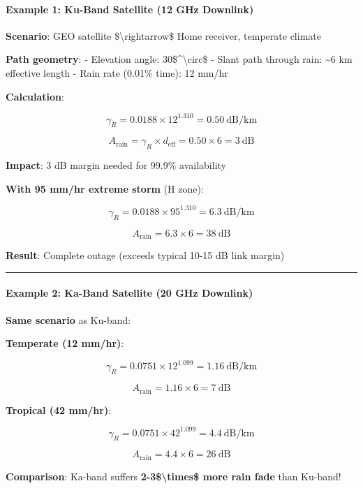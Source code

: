 \paragraph{Example 1: Ku-Band Satellite (12 GHz
Downlink)}\label{example-1-ku-band-satellite-12-ghz-downlink}

\textbf{Scenario}: GEO satellite \$\textbackslash rightarrow\$ Home
receiver, temperate climate

\textbf{Path geometry}: - Elevation angle: 30\$\^{}\textbackslash circ\$
- Slant path through rain: \textasciitilde6 km effective length - Rain
rate (0.01\% time): 12 mm/hr

\textbf{Calculation}:

\[
\gamma_R = 0.0188 \times 12^{1.310} = 0.50\ \text{dB/km}
\]

\[
A_{\text{rain}} = \gamma_R \times d_{\text{eff}} = 0.50 \times 6 = 3\ \text{dB}
\]

\textbf{Impact}: 3 dB margin needed for 99.9\% availability

\textbf{With 95 mm/hr extreme storm} (H zone):

\[
\gamma_R = 0.0188 \times 95^{1.310} = 6.3\ \text{dB/km}
\]

\[
A_{\text{rain}} = 6.3 \times 6 = 38\ \text{dB}
\]

\textbf{Result}: Complete outage (exceeds typical 10-15 dB link margin)

\begin{center}\rule{0.5\linewidth}{0.5pt}\end{center}

\paragraph{Example 2: Ka-Band Satellite (20 GHz
Downlink)}\label{example-2-ka-band-satellite-20-ghz-downlink}

\textbf{Same scenario} as Ku-band:

\textbf{Temperate (12 mm/hr)}:

\[
\gamma_R = 0.0751 \times 12^{1.099} = 1.16\ \text{dB/km}
\]

\[
A_{\text{rain}} = 1.16 \times 6 = 7\ \text{dB}
\]

\textbf{Tropical (42 mm/hr)}:

\[
\gamma_R = 0.0751 \times 42^{1.099} = 4.4\ \text{dB/km}
\]

\[
A_{\text{rain}} = 4.4 \times 6 = 26\ \text{dB}
\]

\textbf{Comparison}: Ka-band suffers \textbf{2-3\$\textbackslash times\$
more rain fade} than Ku-band!

